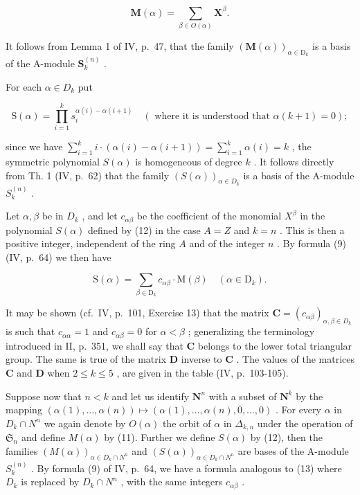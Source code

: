 \[
\mathbf {M} (\alpha) = \sum_ {\beta \in O (\alpha)} \mathbf {X} ^ {\beta}.\tag{11}
\]

It follows from Lemma 1 of IV, p.~47, that the family \((\mathbf{M}(\alpha))_{\alpha \in \mathrm{D}_k}\) is a basis of the A-module \(\mathbf{S}_k^{(n)}\) .

For each \(\alpha \in D_k\) put

\[
\mathrm{S} (\alpha) = \prod_ {i = 1} ^ {k} s _ {i} ^ {\alpha (i) - \alpha (i + 1)} \quad (\text { where   it   is   understood   that } \alpha (k + 1) = 0);\tag{12}
\]

since we have \(\sum_{i=1}^{k} i \cdot (\alpha(i) - \alpha(i+1)) = \sum_{i=1}^{k} \alpha(i) = k\) , the symmetric polynomial \(S(\alpha)\) is homogeneous of degree \(k\) . It follows directly from Th. 1 (IV, p.~62) that the family \((S(\alpha))_{\alpha \in D_k}\) is a basis of the A-module \(S_k^{(n)}\) .

Let \(\alpha, \beta\) be in \(D_k\) , and let \(c_{\alpha\beta}\) be the coefficient of the monomial \(X^\beta\) in the polynomial \(S(\alpha)\) defined by (12) in the case \(A = Z\) and \(k = n\) . This is then a positive integer, independent of the ring \(A\) and of the integer \(n\) . By formula (9) (IV, p.~64) we then have

\[
\mathrm{S} (\alpha) = \sum_ {\beta \in \mathrm{D} _ {k}} c _ {\alpha \beta} \cdot \mathrm{M} (\beta) \quad (\alpha \in \mathrm{D} _ {k}).\tag{13}
\]

It may be shown (cf.~IV, p.~101, Exercise 13) that the matrix \(\mathbf{C} = (c_{\alpha \beta})_{\alpha, \beta \in D_k}\) is such that \(c_{\alpha \alpha} = 1\) and \(c_{\alpha \beta} = 0\) for \(\alpha < \beta\) ; generalizing the terminology introduced in II, p.~351, we shall say that \(\mathbf{C}\) belongs to the lower total triangular group. The same is true of the matrix \(\mathbf{D}\) inverse to \(\mathbf{C}\) . The values of the matrices \(\mathbf{C}\) and \(\mathbf{D}\) when \(2 \leqslant k \leqslant 5\) , are given in the table (IV, p.~103-105).

Suppose now that \(n < k\) and let us identify \(\mathbf{N}^n\) with a subset of \(\mathbf{N}^k\) by the mapping \((\alpha(1), \ldots, \alpha(n)) \mapsto (\alpha(1), \ldots, \alpha(n), 0, \ldots, 0)\) . For every \(\alpha\) in \(D_k \cap N^n\) we again denote by \(O(\alpha)\) the orbit of \(\alpha\) in \(\Delta_{k,n}\) under the operation of \(\mathfrak{S}_n\) and define \(M(\alpha)\) by (11). Further we define \(S(\alpha)\) by (12), then the families \((M(\alpha))_{\alpha \in D_k \cap N^n}\) and \((S(\alpha))_{\alpha \in D_k \cap N^n}\) are bases of the A-module \(S_k^{(n)}\) . By formula (9) of IV, p.~64, we have a formula analogous to (13) where \(D_k\) is replaced by \(D_k \cap N^n\) , with the same integers \(c_{\alpha\beta}\) .

